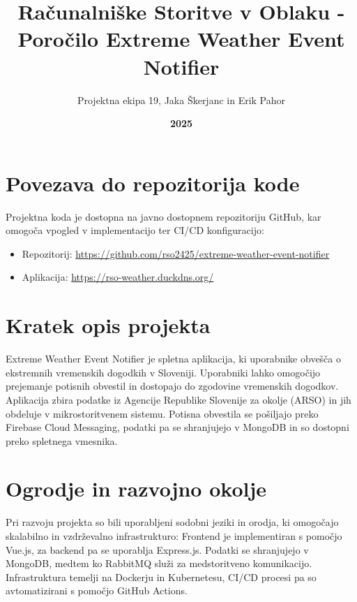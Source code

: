 \documentclass[a4paper,11pt]{article}
\title{\textbf{Računalniške Storitve v Oblaku - Poročilo} \newline Extreme Weather Event Notifier}
\author{Projektna ekipa 19, Jaka Škerjanc in Erik Pahor}
\date{\textbf{2025}}
\begin{document}
\maketitle

\newpage

\section*{Povezava do repozitorija kode}
Projektna koda je dostopna na javno dostopnem repozitoriju GitHub, kar omogo\v{c}a vpogled v implementacijo ter CI/CD konfiguracijo:
\begin{itemize}
	\item Repozitorij: \url{https://github.com/rso2425/extreme-weather-event-notifier}
	\item Aplikacija: \url{https://rso-weather.duckdns.org/}
\end{itemize}

\section*{Kratek opis projekta}
Extreme Weather Event Notifier je spletna aplikacija, ki uporabnike obve\v{s}\v{c}a o ekstremnih vremenskih dogodkih v Sloveniji. Uporabniki lahko omogo\v{c}ijo prejemanje potisnih obvestil in dostopajo do zgodovine vremenskih dogodkov. Aplikacija zbira podatke iz Agencije Republike Slovenije za okolje (ARSO) in jih obdeluje v mikrostoritvenem sistemu. Potisna obvestila se po\v{s}iljajo preko Firebase Cloud Messaging, podatki pa se shranjujejo v MongoDB in so dostopni preko spletnega vmesnika.

\section*{Ogrodje in razvojno okolje}
Pri razvoju projekta so bili uporabljeni sodobni jeziki in orodja, ki omogo\v{c}ajo skalabilno in vzdr\v{z}evalno infrastrukturo:
Frontend je implementiran s pomo\v{c}jo Vue.js, za backend pa se uporablja Express.js. Podatki se shranjujejo v MongoDB, medtem ko RabbitMQ slu\v{z}i za medstoritveno komunikacijo. Infrastruktura temelji na Dockerju in Kubernetesu, CI/CD procesi pa so avtomatizirani s pomo\v{c}jo GitHub Actions.
\newpage
\end{document}
